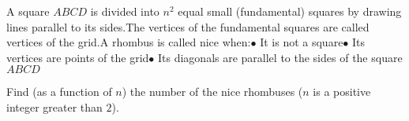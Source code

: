 A square $ABCD$ is divided into $n^2$ equal small (fundamental) squares by drawing lines parallel to its sides.The vertices of the fundamental squares are called vertices of the grid.A rhombus is called nice when:$\bullet$ It is not a square$\bullet$ Its vertices are points of the grid$\bullet$ Its diagonals are parallel to the sides of the square $ABCD$

Find (as a function of $n$) the number of the nice rhombuses ($n$ is a positive integer greater than $2$).